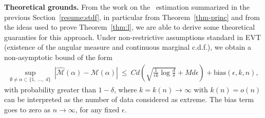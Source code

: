 \textbf{Theoretical grounds.}
From the work on the \stdf~estimation summarized in the previous Section~\ref{resume:stdf}, in particular from Theorem~\ref{thm-princ} and from the ideas used to prove Theorem~\ref{thm:l}, we are able to derive some theoretical guaranties for this approach.
%
Under non-restrictive assumptions standard in EVT (existence of the angular measure and continuous marginal c.d.f.), we obtain a non-asymptotic bound of the form
\begin{align*}
\sup_{\emptyset \neq \alpha \subset \{1,\; \ldots,\; d \}}~ |\widehat{\mathcal{M}}(\alpha)- \mathcal{M}(\alpha)|
~\le~  C d \left( \sqrt{ \frac{1}{\epsilon k}\log\frac{d}{\delta}} + M d\epsilon \right) + \text{bias}(\epsilon, k, n),
\end{align*}
with probability greater than $1-\delta$, where $k = k(n) \to \infty$ with $k(n) = o(n)$ can be interpreted as the number of data considered as extreme. 
The bias term goes to zero as $n \to \infty$, for any fixed $\epsilon$.




